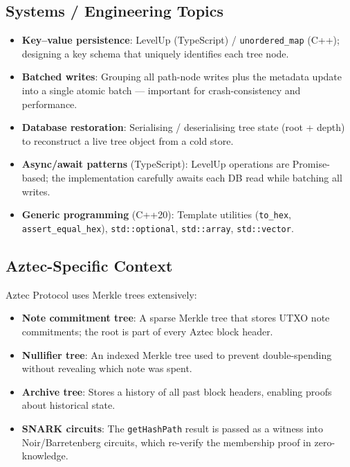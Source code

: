 \documentclass[12pt,a4paper]{article}
\begin{document}
\subsection{Systems / Engineering Topics}

\begin{itemize}
  \item \textbf{Key--value persistence}: LevelUp (TypeScript) /
        \texttt{unordered\_map} (C++); designing a key schema that uniquely
        identifies each tree node.

  \item \textbf{Batched writes}: Grouping all path-node writes plus the
        metadata update into a single atomic batch — important for
        crash-consistency and performance.

  \item \textbf{Database restoration}: Serialising / deserialising tree state
        (root + depth) to reconstruct a live tree object from a cold store.

  \item \textbf{Async/await patterns} (TypeScript): LevelUp operations are
        Promise-based; the implementation carefully awaits each DB read while
        batching all writes.

  \item \textbf{Generic programming} (C++20): Template utilities
        (\texttt{to\_hex}, \texttt{assert\_equal\_hex}),
        \texttt{std::optional}, \texttt{std::array}, \texttt{std::vector}.
\end{itemize}

\subsection{Aztec-Specific Context}

Aztec Protocol uses Merkle trees extensively:
\begin{itemize}
  \item \textbf{Note commitment tree}: A sparse Merkle tree that stores UTXO
        note commitments; the root is part of every Aztec block header.
  \item \textbf{Nullifier tree}: An indexed Merkle tree used to prevent
        double-spending without revealing which note was spent.
  \item \textbf{Archive tree}: Stores a history of all past block headers,
        enabling proofs about historical state.
  \item \textbf{SNARK circuits}: The \texttt{getHashPath} result is passed
        as a witness into Noir/Barretenberg circuits, which re-verify the
        membership proof in zero-knowledge.
\end{itemize}
\end{document}
